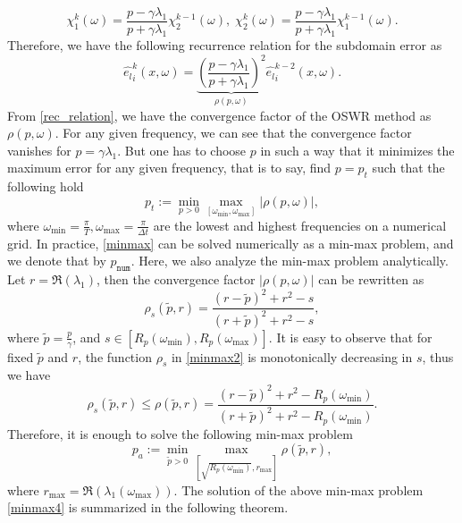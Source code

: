 \documentclass[11pt]{article}
\begin{document}
\[ \chi_1^{k}(\omega) = \frac{p-\gamma\lambda_1}{p+\gamma\lambda_1}\chi_2^{k-1}(\omega),\; \chi_2^{k}(\omega) = \frac{p-\gamma\lambda_1}{p+\gamma\lambda_1}\chi_1^{k-1}(\omega).\]
Therefore, we have the following recurrence relation for the subdomain error as 
\begin{equation}\label{rec_relation}
{\widehat{e_l}}_i^{k}(x, \omega) = \underbrace{\left( \frac{p-\gamma\lambda_1}{p+\gamma\lambda_1} \right)^2}_{\rho(p, \omega)} {\widehat{e_l}}_i^{k-2}(x, \omega).
\end{equation}
From \eqref{rec_relation}, we have the convergence factor of the OSWR method as $\rho(p, \omega)$. For any given frequency, we can see that the convergence factor vanishes for $p=\gamma\lambda_1$. But one has to choose $p$ in such a way that it minimizes the maximum error for any given frequency, that is to say, find $p=p_t$ such that the following hold
\begin{equation}\label{minmax}
p_t:=\min_{p>0}\max_{[\omega_{\min}, \omega_{\max}]} \vert \rho(p, \omega)\vert,
\end{equation} 
where $\omega_{\min}=\frac{\pi}{T}, \omega_{\max}=\frac{\pi}{\Delta t}$ are the lowest and highest frequencies on a numerical grid. In practice, \eqref{minmax} can be solved numerically as a min-max problem, and we denote that by $p_{\texttt{num}}$. Here, we also analyze the min-max problem analytically. Let $r=\Re(\lambda_1)$, then the convergence factor $\vert\rho(p, \omega)\vert$ can be rewritten as 
\begin{equation}\label{minmax2}
\rho_s(\widetilde{p}, r)=\frac{(r - \widetilde{p})^2 + r^2 - s}{(r + \widetilde{p})^2 + r^2 - s},
\end{equation}
where $\widetilde{p}=\frac{p}{\gamma}$, and $s\in [R_p(\omega_{\min}), R_p(\omega_{\max})]$. It is easy to observe that for fixed $\widetilde{p}$ and $r$, the function $\rho_s$ in \eqref{minmax2} is monotonically decreasing in $s$, thus we have  
\begin{equation}\label{minmax3}
\rho_s(\widetilde{p}, r)\leq \rho(\widetilde{p}, r)=\frac{(r - \widetilde{p})^2 + r^2 - R_p(\omega_{\min})}{(r + \widetilde{p})^2 + r^2 - R_p(\omega_{\min})}.
\end{equation}
Therefore, it is enough to solve the following min-max problem  
\begin{equation}\label{minmax4}
p_a:=\min_{\widetilde{p}>0}\max_{[\sqrt{R_p(\omega_{\min})}, r_{\max}]} \rho(\widetilde{p}, r),
\end{equation} 
where $r_{\max}=\Re(\lambda_1(\omega_{\max}))$. The solution of the above min-max problem \eqref{minmax4} is summarized in the following theorem. 
\end{document}
